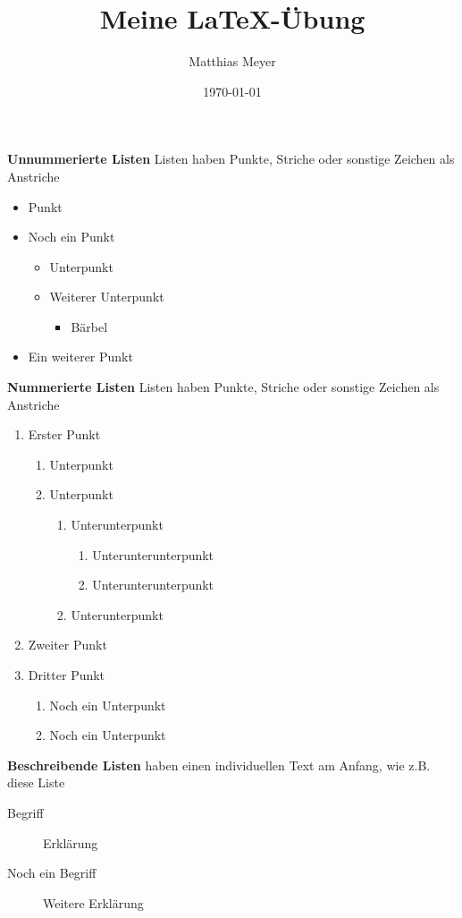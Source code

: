\documentclass[a4paper,twoside,10pt]{article}
\author{Matthias Meyer}
\title{Meine LaTeX-Übung}
\date{\today}
\begin{document}
\textbf{Unnummerierte Listen} Listen haben Punkte, Striche oder sonstige Zeichen als Anstriche
 \begin{itemize}
    \item Punkt
    \item Noch ein Punkt
    \begin{itemize}
        \item Unterpunkt
        \item Weiterer Unterpunkt
        \begin{itemize}
            \item Bärbel
        \end{itemize}        
    \end{itemize}
    \item Ein weiterer Punkt
 \end{itemize}

 \textbf{Nummerierte Listen} Listen haben Punkte, Striche oder sonstige Zeichen als Anstriche

 \begin{enumerate}
     \item Erster Punkt
     \begin{enumerate}
         \item Unterpunkt
         \item Unterpunkt
         \begin{enumerate}
            \item Unterunterpunkt
            \begin{enumerate}
                \item Unterunterunterpunkt
                \item Unterunterunterpunkt
            \end{enumerate}
            \item Unterunterpunkt
         \end{enumerate}
     \end{enumerate}
     \item Zweiter Punkt
     \item Dritter Punkt
     \begin{enumerate}
         \item Noch ein Unterpunkt
         \item Noch ein Unterpunkt
     \end{enumerate}
 \end{enumerate}

 \textbf{Beschreibende Listen} haben einen individuellen Text am Anfang, wie z.B. diese Liste
 
 \begin{description}
     \item[Begriff] Erklärung
     \item[Noch ein Begriff] Weitere Erklärung 
 \end{description}
\end{document}

